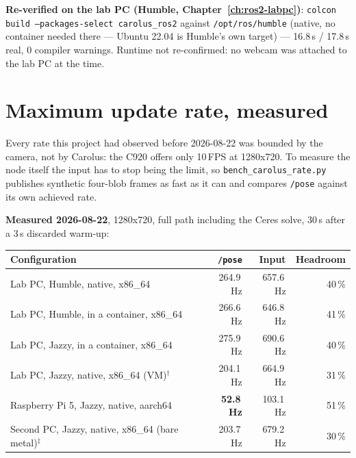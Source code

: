 \documentclass[11pt]{report}
\begin{document}
\textbf{Re-verified on the lab PC (Humble, Chapter~\ref{ch:ros2-labpc})}:
\texttt{colcon build --packages-select carolus\_ros2} against
\texttt{/opt/ros/humble} (native, no container needed there --- Ubuntu 22.04
is Humble's own target) --- 16.8\,s / 17.8\,s real, 0 compiler warnings.
Runtime not re-confirmed: no webcam was attached to the lab PC at the time.

\section{Maximum update rate, measured}
\label{sec:ros2-maxrate}

Every rate this project had observed before 2026-08-22 was bounded by the
camera, not by Carolus: the C920 offers only 10\,FPS at 1280x720. To measure
the node itself the input has to stop being the limit, so
\texttt{bench\_carolus\_rate.py} publishes synthetic four-blob frames as fast
as it can and compares \texttt{/pose} against its own achieved rate.

\textbf{Measured 2026-08-22}, 1280x720, full path including the Ceres solve,
30\,s after a 3\,s discarded warm-up:

\begin{center}
\begin{tabular}{@{}lrrr@{}}
\toprule
\textbf{Configuration} & \textbf{\texttt{/pose}} & \textbf{Input} & \textbf{Headroom} \\
\midrule
Lab PC, Humble, native, x86\_64        & 264.9\,Hz & 657.6\,Hz & 40\,\% \\
Lab PC, Humble, in a container, x86\_64 & 266.6\,Hz & 646.8\,Hz & 41\,\% \\
Lab PC, Jazzy, in a container, x86\_64  & 275.9\,Hz & 690.6\,Hz & 40\,\% \\
Lab PC, Jazzy, native, x86\_64 (VM)$^\dagger$ & 204.1\,Hz & 664.9\,Hz & 31\,\% \\
Raspberry Pi 5, Jazzy, native, aarch64 & \textbf{52.8\,Hz} & 103.1\,Hz & 51\,\% \\
Second PC, Jazzy, native, x86\_64 (bare metal)$^\ddagger$ & 203.7\,Hz & 679.2\,Hz & 30\,\% \\
\bottomrule
\end{tabular}
\end{center}
\end{document}

